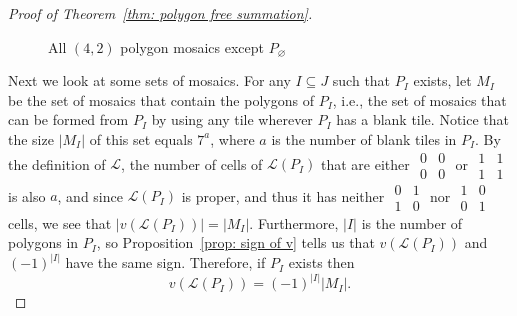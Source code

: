 \documentclass[12pt]{article}
\theoremstyle{plain}
\theoremstyle{remark}
\theoremstyle{definition}
\theoremstyle{remark}
\theoremstyle{definition}
\newcommand{\cellA}[4]{ \draw[thick] ( #1 , #2 ) rectangle ( #3 , #4 ); \draw[red, thick, densely dotted] (#3 * 0.5 + #1 * 0.5 , #2) -- (#1, #4 * 0.5 + #2 * 0.5);}
\newcommand{\cellB}[4]{ \draw[thick] ( #1 , #2 ) rectangle ( #3 , #4 ); \draw[red, thick, densely dotted] (#3 * 0.5 + #1 * 0.5 , #2) -- (#3, #4 * 0.5 + #2 * 0.5);}
\newcommand{\cellC}[4]{ \draw[thick] ( #1 , #2 ) rectangle ( #3 , #4 ); \draw[red, thick, densely dotted] (#3 * 0.5 + #1 * 0.5 , #4) -- (#3, #4 * 0.5 + #2 * 0.5);}
\newcommand{\cellD}[4]{ \draw[thick] ( #1 , #2 ) rectangle ( #3 , #4 ); \draw[red, thick, densely dotted] (#3 * 0.5 + #1 * 0.5 , #4) -- (#1, #4 * 0.5 + #2 * 0.5);}
\newcommand{\cellF}[4]{ \draw[thick] ( #1 , #2 ) rectangle ( #3 , #4 ); \draw[red, thick, densely dotted] (#3 * 0.5 + #1 * 0.5 , #2) -- (#3 * 0.5 + #1 * 0.5 , #4);}
\newcommand{\lablnode}[3]{\node[shape=circle,draw=none,fill=none, inner sep=0pt,minimum size=0pt] (A) at ( #1 , #2 ) {#3};}
\begin{document}
\begin{proof}[Proof of Theorem~\ref{thm: polygon free summation}]
\begin{figure}[h!]
\begin{center}
\end{center}
\caption{All $(4,2)$ polygon mosaics except $P_{\varnothing}$}
\label{fig: polygons in different places}
\end{figure}

Next we look at some sets of mosaics. For any $I\subseteq J$ such that $P_{I}$ exists, let $M_{I}$ be the set of mosaics that contain the polygons of $P_{I}$, i.e., the set of mosaics that can be formed from $P_{I}$ by using any tile wherever $P_{I}$ has a blank tile. Notice that the size $\left|M_{I}\right|$ of this set equals $7^{a}$, where $a$ is the number of blank tiles in $P_{I}$. By the definition of $\mathscr{L}$, the number of cells of $\mathscr{L}\left(P_{I}\right)$ that are either $\begin{smallmatrix}0 & 0\\0 & 0 \end{smallmatrix}$ or $\begin{smallmatrix}1 & 1\\1 & 1 \end{smallmatrix}$ is also $a$, and since $\mathscr{L}\left(P_{I}\right)$ is proper, and thus it has neither $\begin{smallmatrix}0 & 1\\1 & 0 \end{smallmatrix}$ nor $\begin{smallmatrix}1 & 0\\0 & 1 \end{smallmatrix}$ cells, we see that $\left|v\left(\mathscr{L}\left(P_{I}\right)\right)\right|=\left|M_{I}\right|$. Furthermore, $\left|I\right|$ is the number of polygons in $P_{I}$, so Proposition~\ref{prop: sign of v} tells us that $v\left(\mathscr{L}\left(P_{I}\right)\right)$ and $\left(-1\right)^{\left|I\right|}$ have the same sign. Therefore,
if $P_{I}$ exists then 
\[
v\left(\mathscr{L}\left(P_{I}\right)\right)=\left(-1\right)^{\left|I\right|}\left|M_{I}\right|.
\]


\end{proof}
\end{document}
